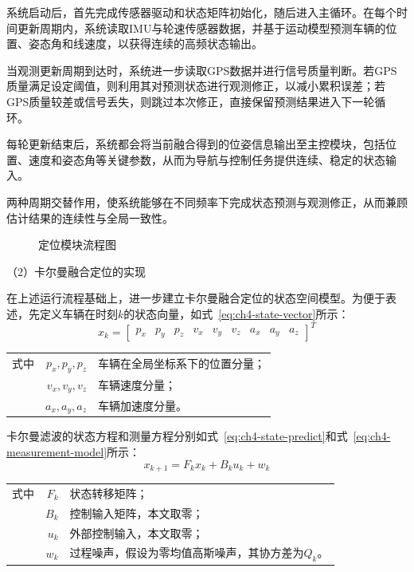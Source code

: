 系统启动后，首先完成传感器驱动和状态矩阵初始化，随后进入主循环。在每个时间更新周期内，系统读取IMU与轮速传感器数据，并基于运动模型预测车辆的位置、姿态角和线速度，以获得连续的高频状态输出。

当观测更新周期到达时，系统进一步读取GPS数据并进行信号质量判断。若GPS质量满足设定阈值，则利用其对预测状态进行观测修正，以减小累积误差；若GPS质量较差或信号丢失，则跳过本次修正，直接保留预测结果进入下一轮循环。

每轮更新结束后，系统都会将当前融合得到的位姿信息输出至主控模块，包括位置、速度和姿态角等关键参数，从而为导航与控制任务提供连续、稳定的状态输入。

两种周期交替作用，使系统能够在不同频率下完成状态预测与观测修正，从而兼顾估计结果的连续性与全局一致性。

\begin{figure}[h]
\centering

\caption{定位模块流程图}
\label{定位模块流程图}
\end{figure}

（2）卡尔曼融合定位的实现

在上述运行流程基础上，进一步建立卡尔曼融合定位的状态空间模型。为便于表述，先定义车辆在时刻$k$的状态向量，如式~\eqref{eq:ch4-state-vector}所示：
\begin{equation}
\label{eq:ch4-state-vector}
x_{k}=
\begin{bmatrix}
p_{x} & p_{y} & p_{z} & v_{x} & v_{y} & v_{z} & a_{x} & a_{y} & a_{z}
\end{bmatrix}^{T}
\end{equation}
\begin{tabularx}{\textwidth}{@{}l@{\quad}r@{———}X@{}}
式中& $p_x,p_y,p_z$ & 车辆在全局坐标系下的位置分量；\\
& $v_x,v_y,v_z$ & 车辆速度分量；\\
& $a_x,a_y,a_z$ & 车辆加速度分量。\\
\end{tabularx}\vspace{3.15bp}

卡尔曼滤波的状态方程和测量方程分别如式~\eqref{eq:ch4-state-predict}和式~\eqref{eq:ch4-measurement-model}所示：
\begin{equation}
\label{eq:ch4-state-predict}
x_{k+1} = F_{k}x_{k} + B_{k}u_{k} + w_{k}
\end{equation}
\begin{tabularx}{\textwidth}{@{}l@{\quad}r@{———}X@{}}
式中& $F_k$ & 状态转移矩阵；\\
& $B_k$ & 控制输入矩阵，本文取零；\\
& $u_k$ & 外部控制输入，本文取零；\\
& $w_k$ & 过程噪声，假设为零均值高斯噪声，其协方差为$Q_k$。\\
\end{tabularx}\vspace{3.15bp}

